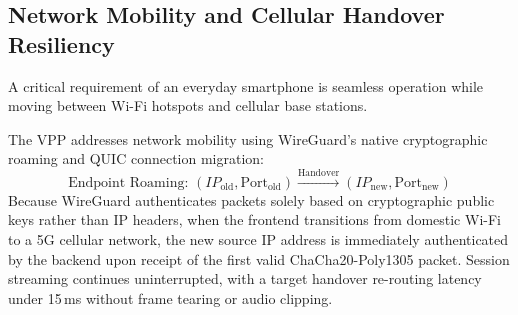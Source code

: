 \subsection{Network Mobility and Cellular Handover Resiliency}
A critical requirement of an everyday smartphone is seamless operation while moving between Wi-Fi hotspots and cellular base stations. 

The VPP addresses network mobility using WireGuard's native cryptographic roaming and QUIC connection migration:
\begin{equation}
    \text{Endpoint Roaming: } (IP_{\text{old}}, \text{Port}_{\text{old}}) \xrightarrow{\text{Handover}} (IP_{\text{new}}, \text{Port}_{\text{new}})
\end{equation}
Because WireGuard authenticates packets solely based on cryptographic public keys rather than IP headers, when the frontend transitions from domestic Wi-Fi to a 5G cellular network, the new source IP address is immediately authenticated by the backend upon receipt of the first valid ChaCha20-Poly1305 packet. Session streaming continues uninterrupted, with a target handover re-routing latency under 15\,ms without frame tearing or audio clipping.
